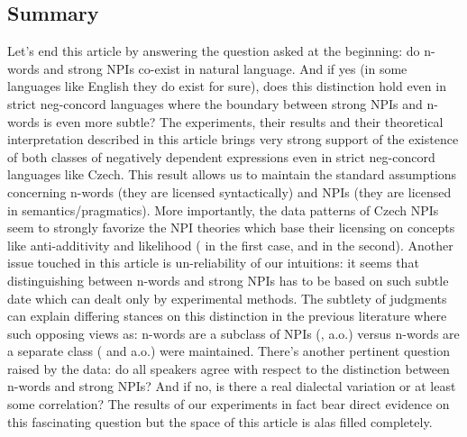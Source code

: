 \documentclass[12pt]{scrartcl}
\begin{document}
\hypertarget{summary}{%
\subsection{Summary}\label{summary}}

Let's end this article by answering the question asked at the beginning: do  n-words and strong NPIs co-exist in natural language. And if yes (in some languages like English they do exist for sure), does this distinction hold even in strict neg-concord languages where the boundary between strong NPIs and n-words is even more subtle? The experiments, their results and their theoretical interpretation described in this article brings very strong support of the existence of both classes of negatively dependent expressions even in strict neg-concord languages like Czech. This result allows us to maintain the standard assumptions concerning n-words (they are licensed syntactically) and   NPIs (they are licensed in semantics/pragmatics). More importantly, the data patterns of Czech NPIs seem to strongly favorize the NPI theories which base their licensing on concepts like  anti-additivity and likelihood (\citealt{zwarts1998three} in the first case, \citealt{heim1984note} and \citealt{crnivc2014against} in the second). Another issue touched in this article is un-reliability of our intuitions: it seems that distinguishing between n-words and strong NPIs has to be based on such subtle date which can dealt only by experimental methods. The subtlety of judgments can explain differing stances on this distinction in the previous literature where such opposing views as: n-words are a subclass of NPIs (\citealt{ladusaw1992expressing}, \citealt{fualuaus2016fragment} a.o.) versus n-words are a separate class (\citealt{zeijlstra2008negative} and \citealt{giannakidou2017landscape} a.o.) were maintained. There's another pertinent question raised by the data: do all speakers agree with respect to the distinction between n-words and strong NPIs? And if no, is there a real dialectal variation or at least some correlation? The results of our experiments in fact bear direct evidence on this fascinating question  but the space of this article is alas filled completely.



\end{document}
